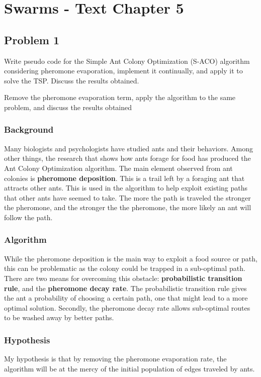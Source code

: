 
\chapter{Swarms - Text Chapter 5}
\section{Problem 1}
Write pseudo code for the Simple Ant Colony Optimization (S-ACO) algorithm considering pheromone evaporation, implement it continually, and apply it to solve the TSP.  Discuss the results obtained.

Remove the pheromone evaporation term, apply the algorithm to the same problem, and discuss the results obtained

\subsection{Background}
Many biologists and psychologists have studied ants and their behaviors.  Among other things, the research that shows how ants forage for food has produced the Ant Colony Optimization algorithm.  The main element observed from ant colonies is \textbf{pheromone deposition}.  This is a trail left by a foraging ant that attracts other ants.  This is used in the algorithm to help exploit existing paths that other ants have seemed to take. The more the path is traveled the stronger the pheromone, and the stronger the the pheromone, the more likely an ant will follow the path.


\subsection{Algorithm}
While the pheromone deposition is the main way to exploit a food source or path, this can be problematic as the colony could be trapped in a sub-optimal path. There are two means for overcoming this obstacle: \textbf{probabilistic transition rule}, and the  \textbf{pheromone decay rate}.  The probabilistic transition rule gives the ant a probability of choosing a certain path, one that might lead to a more optimal solution.  Secondly, the pheromone decay rate allows sub-optimal routes to be washed away by better paths.

\subsection{Hypothesis}
My hypothesis is that by removing the pheromone evaporation rate, the algorithm will be at the mercy of the initial population of edges traveled by ants.  

